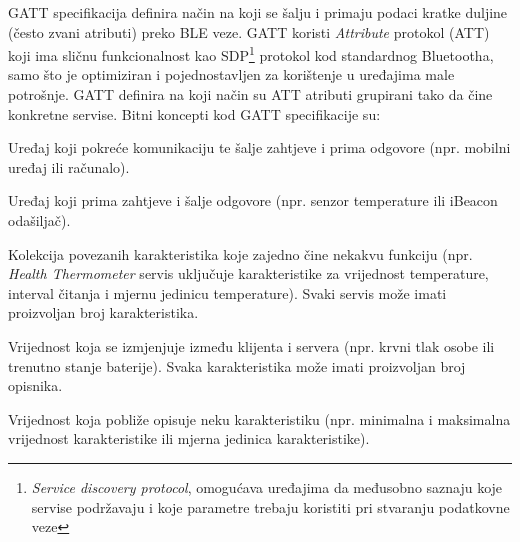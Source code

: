 GATT specifikacija definira način na koji se šalju i primaju podaci kratke duljine (često zvani atributi) preko BLE veze. 
GATT koristi \textit{Attribute} protokol (ATT) koji ima sličnu funkcionalnost kao SDP\footnote{\textit{Service discovery protocol}, omogućava uređajima da međusobno saznaju koje servise podržavaju i koje parametre trebaju koristiti pri stvaranju podatkovne veze} protokol kod standardnog Bluetootha, samo što je optimiziran i pojednostavljen za korištenje u uređajima male potrošnje. 
GATT definira na koji način su ATT atributi grupirani tako da čine konkretne servise. 
Bitni koncepti kod GATT specifikacije su:
\begin{description}[style=nextline]
    \item[Klijent] 
        Uređaj koji pokreće komunikaciju te šalje zahtjeve i prima odgovore (npr. mobilni uređaj ili računalo).
    \item[Server] 
        Uređaj koji prima zahtjeve i šalje odgovore (npr. senzor temperature ili iBeacon odašiljač).
    \item[Servis] 
        Kolekcija povezanih karakteristika koje zajedno čine nekakvu funkciju (npr. \textit{Health Thermometer} servis uključuje                     karakteristike za vrijednost temperature, interval čitanja i mjernu jedinicu temperature). 
        Svaki servis može imati proizvoljan broj karakteristika.
    \item[Karakteristika\footnote{engl. \textit{Characteristic}}] 
        Vrijednost koja se izmjenjuje između klijenta i servera (npr. krvni tlak osobe ili trenutno stanje baterije). 
        Svaka karakteristika može imati proizvoljan broj opisnika.
    \item[Opisnik\footnote{engl. \textit{Descriptor}}] 
        Vrijednost koja pobliže opisuje neku karakteristiku (npr. minimalna i maksimalna vrijednost karakteristike ili mjerna jedinica karakteristike).
\end{description}